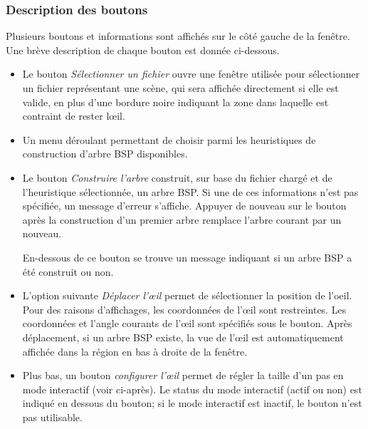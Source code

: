 \subsubsection*{Description des boutons}
Plusieurs boutons et informations sont affichés sur le côté gauche de
la fenêtre. Une brève description de chaque bouton est donnée ci-dessous.
\begin{itemize}
\item Le bouton \emph{Sélectionner un fichier} ouvre une fenêtre utilisée
  pour sélectionner un fichier représentant une scène, qui sera affichée
  directement si elle est valide, en plus d'une bordure noire indiquant
  la zone dans laquelle est contraint de rester l\oe{}il.
\item Un menu déroulant permettant de choisir parmi les heuristiques
  de construction d'arbre BSP disponibles.
\item Le bouton \emph{Construire l'arbre} construit, sur base du fichier
  chargé et de l'heuristique sélectionnée, un arbre BSP.
  Si une de ces informations n'est pas spécifiée, un message d'erreur s'affiche.
  Appuyer de nouveau sur le bouton après la construction d'un premier arbre
  remplace l'arbre courant par un nouveau.

  En-dessous de ce bouton se trouve un message indiquant si  un arbre BSP a été
  construit ou non.
\item L'option suivante \emph{Déplacer l'\oe{}il} permet de sélectionner
  la position de l'oeil. Pour des raisons d'affichages, les coordonnées de
  l'\oe{}il sont restreintes. Les coordonnées et l'angle courants de
  l'\oe{}il sont spécifiés sous le bouton. Après déplacement, si un arbre
  BSP existe, la vue de l'\oe{}il est automatiquement affichée dans la région
  en bas à droite de la fenêtre.
\item Plus bas, un bouton \emph{configurer l'\oe{}il} permet de régler la
  taille d'un pas en mode interactif (voir ci-après). Le status du mode
  interactif (actif ou non) est indiqué en dessous du bouton; si
  le mode interactif est inactif, le bouton n'est pas utilisable.
\end{itemize}
